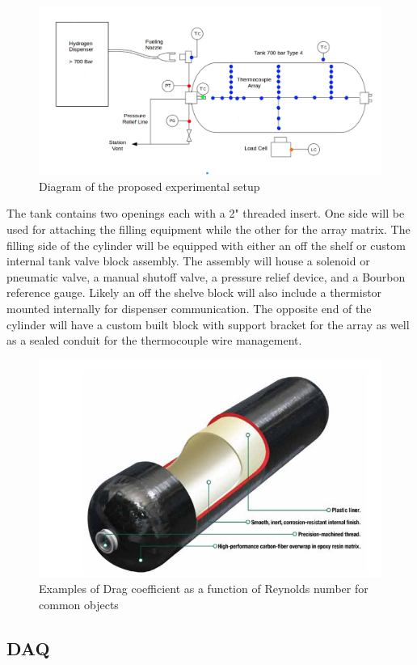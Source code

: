 \documentclass[paper=a4, fontsize=11pt, abstract=on]{scrartcl}
\numberwithin{equation}{section}		%
\numberwithin{figure}{section}			%
\numberwithin{table}{section}				%
\begin{document}
\begin{figure}[H]
\centering
\includegraphics[width=0.95\linewidth]{schem2}
\caption{Diagram of the proposed experimental setup}
\label{exp}
\end{figure}





The tank contains two openings each with a 2" threaded insert. One side will be used for attaching the filling equipment while the other for the array matrix. The filling side of the cylinder will be equipped with either an off the shelf or custom internal tank valve block assembly. The assembly will house a solenoid or pneumatic valve, a manual shutoff valve, a pressure relief device, and a Bourbon reference gauge. Likely an off the shelve block will also include a thermistor mounted internally for dispenser communication. The opposite end of the cylinder will have a custom built block with support bracket for the array as well as a sealed conduit for the thermocouple wire management.

\begin{figure}[H]
\centering
\includegraphics[width=0.6\linewidth]{tschem}
\caption{Examples of Drag coefficient as a function of Reynolds number for common objects}
\label{tschem}
\end{figure}


\subsection{DAQ} 
\end{document}
